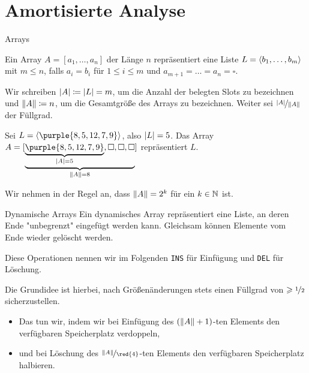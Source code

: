 \section{Amortisierte Analyse}

\begin{frame}{Arrays}
\begin{definition}[Array]
Ein \alert{Array} $A = [ a_1, \dots, a_n ]$ der L\"ange $n$ repr\"asentiert eine Liste $L = \alglist{b_1, \dots, b_m}$ mit $m \leq n$, falls $a_i = b_i$ f\"ur $1 \leq i \leq m$ und $a_{m+1} = \dots = a_n = \square$.

Wir schreiben $\abs{A} \coloneqq \abs{L} = m$, um die Anzahl der \alert{belegten Slots} zu bezeichnen und $\norm{A} \coloneqq n$, um die \alert{Gesamtgr\"o{\ss}e} des Arrays zu bezeichnen.
Weiter sei $\nicefrac{\abs{A}}{\norm{A}}$ der \alert{F\"ullgrad}.
\end{definition}

\begin{example}
Sei $L = \alglist{\purple{8, 5, 12, 7, 9}}$, also $\abs{L} = 5$.
Das Array $A = [ \underbrace{\underbrace{\purple{8, 5, 12, 7, 9}}_{\abs{A} = 5}, \square, \square, \square}_{\norm{A} = 8} ]$ repr\"asentiert $L$.
\end{example}

\begin{remark}
Wir nehmen in der Regel an, dass $\norm{A} = 2^k$ f\"ur ein $k \in \nat$ ist.
\end{remark}
\end{frame}

\begin{frame}{Dynamische Arrays}
Ein \alert{dynamisches Array} repr\"asentiert eine Liste, an deren Ende "unbegrenzt" eingef\"ugt werden kann.
Gleichsam k\"onnen Elemente vom Ende wieder gel\"oscht werden.

Diese Operationen nennen wir im Folgenden \texttt{INS} f\"ur \alert{Einf\"ugung} und \texttt{DEL} f\"ur \alert{L\"oschung}.

Die Grundidee ist hierbei, \alert{nach Größenänderungen} stets einen \alert{F\"ullgrad} von $\geq \nicefrac{1}{2}$ sicherzustellen.
\begin{itemize}
    \item Das tun wir, indem wir bei Einf\"ugung des $(\norm{A}+1)$-ten Elements den verf\"ugbaren Speicherplatz \alert{verdoppeln}, 
    \item und bei L\"oschung des $\nicefrac{\norm{A}}{\red{4}}$-ten Elements den verf\"ugbaren Speicherplatz \alert{halbieren}.
\end{itemize}
\end{frame}

